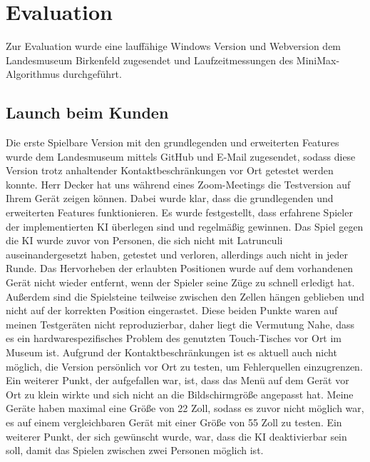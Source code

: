 
\chapter{Evaluation}
\label{ch:Evaluierung}
Zur Evaluation wurde eine lauffähige Windows Version und Webversion dem Landesmuseum Birkenfeld zugesendet und Laufzeitmessungen des MiniMax-Algorithmus durchgeführt.

\section{Launch beim Kunden}
\label{ch:Evaluierung:sec:Abschnitt1}
Die erste Spielbare Version mit den grundlegenden und erweiterten Features wurde dem Landesmuseum mittels GitHub und E-Mail zugesendet, sodass diese Version trotz anhaltender Kontaktbeschränkungen vor Ort getestet werden konnte. Herr Decker hat uns während eines Zoom-Meetings die Testversion auf Ihrem Gerät zeigen können. Dabei wurde klar, dass die grundlegenden und erweiterten Features funktionieren. Es wurde festgestellt, dass erfahrene Spieler der implementierten KI überlegen sind und regelmäßig gewinnen. Das Spiel gegen die KI wurde zuvor von Personen, die sich nicht mit Latrunculi auseinandergesetzt haben,  getestet und verloren, allerdings auch nicht in jeder Runde. Das Hervorheben der erlaubten Positionen wurde auf dem vorhandenen Gerät nicht wieder entfernt, wenn der Spieler seine Züge zu schnell erledigt hat. Außerdem sind die Spielsteine teilweise zwischen den Zellen hängen geblieben und nicht auf der korrekten Position eingerastet. Diese beiden Punkte waren auf meinen Testgeräten nicht reproduzierbar, daher liegt die Vermutung Nahe, dass es ein hardwarespezifisches Problem des genutzten Touch-Tisches vor Ort im Museum ist. Aufgrund der Kontaktbeschränkungen ist es aktuell auch nicht möglich, die Version persönlich vor Ort zu testen, um Fehlerquellen einzugrenzen. Ein weiterer Punkt, der aufgefallen war, ist, dass das Menü auf dem Gerät vor Ort zu klein wirkte und sich nicht an die Bildschirmgröße angepasst hat. Meine Geräte haben maximal eine Größe von 22 Zoll, sodass es zuvor nicht möglich war, es auf einem vergleichbaren Gerät mit einer Größe von 55 Zoll zu testen.
Ein weiterer Punkt, der sich gewünscht wurde, war, dass die KI deaktivierbar sein soll, damit das Spielen zwischen zwei Personen möglich ist.

